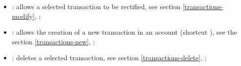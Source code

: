 \vspace{3mm}
\noindent
\begin{minipage}{.7\linewidth}
	\begin{itemize}[rightmargin=.6cm]
		\item {}: allows a selected transaction to be rectified, see section \vref{transactions-modify}, ;%
		\item {}: allows the creation of a new transaction in an account (shortcut ), see the section \vref{transactions-new}, ;%
		\item {}: deletes a selected transaction, see section \vref{transactions-delete}, ;
	\end{itemize}
\end{minipage}
\hspace{10pt}	
